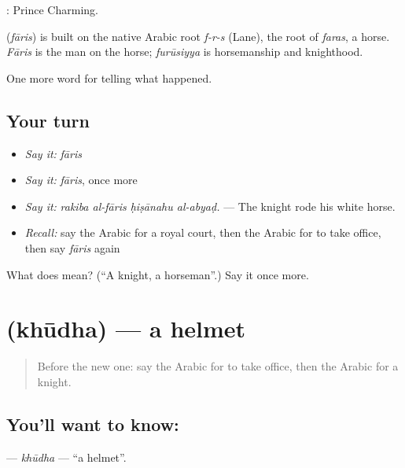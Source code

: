  : Prince Charming.

\begin{cousinweb}
\textbf{} (\emph{fāris}) is built on the native Arabic root \emph{f-r-s} (Lane), the root of \emph{faras}, a horse. \emph{Fāris} is the man on the horse; \emph{furūsiyya} is horsemanship and knighthood.
\end{cousinweb}

\begin{grammarlens}[title={What you've built}]
One more word for telling what happened.
\end{grammarlens}

\subsection*{Your turn}
\begin{itemize}
\raggedright
  \item \emph{Say it:} \emph{fāris}
  \item \emph{Say it:} \emph{fāris}, once more
  \item \emph{Say it:} \emph{rakiba al-fāris ḥiṣānahu al-abyaḍ.} — The knight rode his white horse.
  \item \emph{Recall:} say the Arabic for a royal court, then the Arabic for to take office, then say \emph{fāris} again
\end{itemize}

\begin{tcolorbox}[breakable,colback=teal!4,colframe=teal!35!black,title={Before you move on}]
What does  mean? (\textquotedblleft{}A knight, a horseman\textquotedblright{}.) Say it once more.
\end{tcolorbox}
\section[\texorpdfstring{\ar{خوذة} (khūdha)}{خوذة (khūdha)}]{ (khūdha) — a helmet}

\label{lesson:AR-C341-khudha}



\begin{quote}
Before the new one: say the Arabic for to take office, then the Arabic for a knight.
\end{quote}

\subsection*{You'll want to know: }
\textbf{} — \emph{khūdha} — \textquotedblleft{}a helmet\textquotedblright{}.

